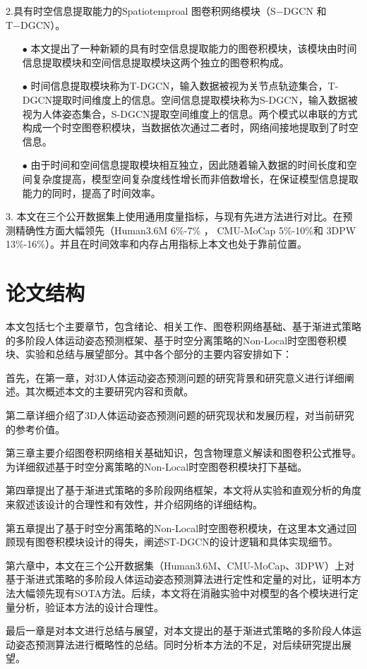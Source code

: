 2.具有时空信息提取能力的Spatiotemproal 图卷积网络模块（S−DGCN 和 T−DGCN）。
\begin{enumerate}[topsep = 0 pt, itemsep= 0 pt, parsep=0pt, partopsep=0pt, leftmargin=44pt, itemindent=0pt, labelsep=6pt]
	\item[$\bullet$] 本文提出了一种新颖的具有时空信息提取能力的图卷积模块，该模块由时间信息提取模块和空间信息提取模块这两个独立的图卷积构成。
	\item[$\bullet$] 时间信息提取模块称为T-DGCN，输入数据被视为关节点轨迹集合，T-DGCN提取时间维度上的信息。空间信息提取模块称为S-DGCN，输入数据被视为人体姿态集合，S-DGCN提取空间维度上的信息。两个模式以串联的方式构成一个时空图卷积模块，当数据依次通过二者时，网络间接地提取到了时空信息。
	\item[$\bullet$] 由于时间和空间信息提取模块相互独立，因此随着输入数据的时间长度和空间复杂度提高，模型空间复杂度线性增长而非倍数增长，在保证模型信息提取能力的同时，提高了时间效率。
\end{enumerate}

3. 本文在三个公开数据集上使用通用度量指标，与现有先进方法进行对比。在预测精确性方面大幅领先（Human3.6M 6\%-7\% ， CMU-MoCap 5\%-10\%和 3DPW 13\%-16\%）。并且在时间效率和内存占用指标上本文也处于靠前位置。

\section{论文结构}
本文包括七个主要章节，包含绪论、相关工作、图卷积网络基础、基于渐进式策略的多阶段人体运动姿态预测框架、基于时空分离策略的Non-Local时空图卷积模块、实验和总结与展望部分。其中各个部分的主要内容安排如下：

首先，在第一章，对3D人体运动姿态预测问题的研究背景和研究意义进行详细阐述。其次概述本文的主要研究内容和贡献。

第二章详细介绍了3D人体运动姿态预测问题的研究现状和发展历程，对当前研究的参考价值。

第三章主要介绍图卷积网络相关基础知识，包含物理意义解读和图卷积公式推导。为详细叙述基于时空分离策略的Non-Local时空图卷积模块打下基础。

第四章提出了基于渐进式策略的多阶段网络框架，本文将从实验和直观分析的角度来叙述该设计的合理性和有效性，并介绍网络的详细结构。

第五章提出了基于时空分离策略的Non-Local时空图卷积模块，在这里本文通过回顾现有图卷积模块设计的得失，阐述ST-DGCN的设计逻辑和具体实现细节。

第六章中，本文在三个公开数据集（Human3.6M、CMU-MoCap、3DPW）上对基于渐进式策略的多阶段人体运动姿态预测算法进行定性和定量的对比，证明本方法大幅领先现有SOTA方法。后续，本文将在消融实验中对模型的各个模块进行定量分析，验证本方法的设计合理性。

最后一章是对本文进行总结与展望，对本文提出的基于渐进式策略的多阶段人体运动姿态预测算法进行概略性的总结。同时分析本方法的不足，对后续研究提出展望。



